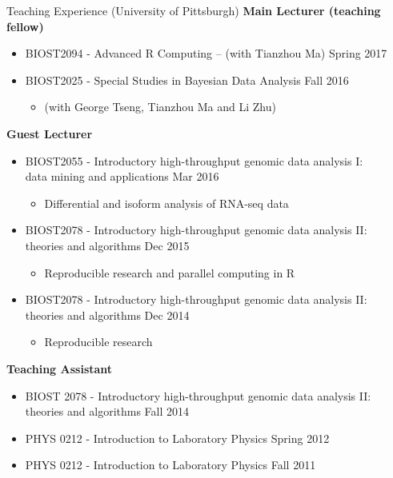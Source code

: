 \documentclass{resume} %
\begin{document}
\begin{rSection}{Teaching Experience (University of Pittsburgh)}
\textbf{Main Lecturer (teaching fellow)}
\begin{itemize}[noitemsep,topsep=0pt]
\item BIOST2094 - Advanced R Computing -- (with Tianzhou Ma) \hfill Spring 2017
\item BIOST2025 - Special Studies in Bayesian Data Analysis  \hfill Fall 2016
\begin{itemize}[noitemsep,topsep=0pt]
\item{(with George Tseng, Tianzhou Ma and Li Zhu)}
\end{itemize}
\end{itemize}


\textbf{Guest Lecturer}
\begin{itemize}[noitemsep,topsep=0pt]
\item BIOST2055 - Introductory high-throughput genomic data analysis I: \\data mining and applications \hfill Mar 2016
\begin{itemize}[noitemsep,topsep=0pt]
\item{Differential and isoform analysis of RNA-seq data}
\end{itemize}
\item BIOST2078 - Introductory high-throughput genomic data analysis II: \\theories and algorithms  \hfill Dec 2015
\begin{itemize}[noitemsep,topsep=0pt]
\item{Reproducible research and parallel computing in R}
\end{itemize}
\item BIOST2078 - Introductory high-throughput genomic data analysis II: \\theories and algorithms  \hfill Dec 2014
\begin{itemize}[noitemsep,topsep=0pt]
\item{Reproducible research}
\end{itemize}
\end{itemize}

\textbf{Teaching Assistant}
\begin{itemize}[noitemsep,topsep=0pt]
\item BIOST 2078 - Introductory high-throughput genomic data analysis II: \\theories and algorithms \hfill {Fall 2014}
\item PHYS 0212 - Introduction to Laboratory Physics \hfill {Spring 2012}
\item PHYS 0212 - Introduction to Laboratory Physics \hfill {Fall 2011}
\end{itemize}

\end{rSection}
\end{document}
